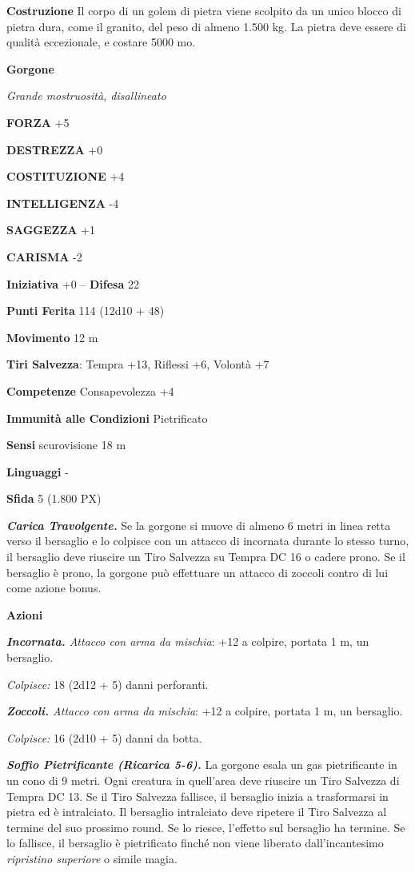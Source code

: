 \begin{multicols}{2}
	\textbf{Costruzione}
	Il corpo di un golem di pietra viene scolpito da un unico blocco di pietra dura, come il granito, del peso di almeno 1.500 kg. La pietra deve essere di qualità eccezionale, e costare 5000 mo.


	\medskip{}\textbf{Gorgone}

	\textit{Grande mostruosità, disallineato}

	\textbf{FORZA} +5

	\textbf{DESTREZZA} +0

	\textbf{COSTITUZIONE} +4

	\textbf{INTELLIGENZA} -4

	\textbf{SAGGEZZA} +1

	\textbf{CARISMA} -2

	\textbf{Iniziativa} +0 -- \textbf{Difesa} 22

	\textbf{Punti Ferita} 114 (12d10 + 48)

	\textbf{Movimento} 12 m

	\textbf{Tiri Salvezza}: Tempra +13, Riflessi +6, Volontà +7

	\textbf{Competenze} Consapevolezza +4

	\textbf{Immunità alle Condizioni} Pietrificato

	\textbf{Sensi} scurovisione 18 m

	\textbf{Linguaggi} -

	\textbf{Sfida} 5 (1.800 PX)

	\textit{\textbf{Carica Travolgente.}} Se la gorgone si muove di almeno 6 metri in linea retta verso il bersaglio e lo colpisce con un attacco di incornata durante lo stesso turno, il bersaglio deve riuscire un Tiro Salvezza su Tempra DC 16 o cadere prono. Se il bersaglio è prono, la gorgone può effettuare un attacco di zoccoli contro di lui come azione bonus.

	\textbf{Azioni}

	\textit{\textbf{Incornata.} Attacco con arma da mischia}: +12 a colpire, portata 1 m, un bersaglio.

	\textit{Colpisce:} 18 (2d12 + 5) danni perforanti.

	\textit{\textbf{Zoccoli.} Attacco con arma da mischia}: +12 a colpire, portata 1 m, un bersaglio.

	\textit{Colpisce:} 16 (2d10 + 5) danni da botta.

	\textit{\textbf{Soffio Pietrificante (Ricarica 5-6).}} La gorgone esala un gas pietrificante in un cono di 9 metri. Ogni creatura in quell'area deve riuscire un Tiro Salvezza di Tempra DC 13. Se il Tiro Salvezza fallisce, il bersaglio inizia a trasformarsi in pietra ed è intralciato. Il bersaglio intralciato deve ripetere il Tiro Salvezza al termine del suo prossimo round. Se lo riesce, l'effetto sul bersaglio ha termine. Se lo fallisce, il bersaglio è pietrificato finché non viene liberato dall'incantesimo \textit{ripristino superiore} o simile magia.


\end{multicols}
